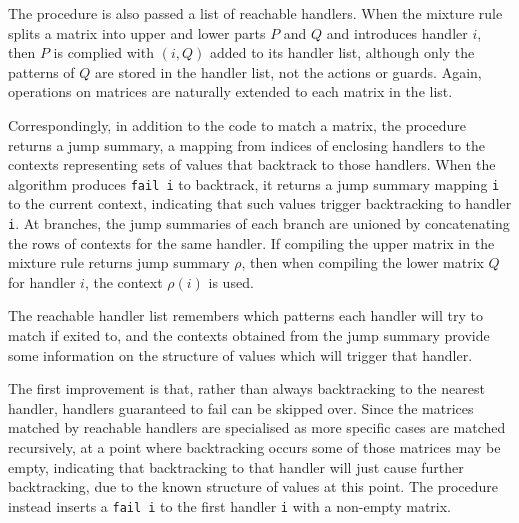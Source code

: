 The procedure is also passed a list of reachable handlers. When the mixture rule splits a matrix into upper and lower parts $P$ and $Q$ and introduces handler $i$, then $P$ is complied with $(i, Q)$ added to its handler list, although only the patterns of $Q$ are stored in the handler list, not the actions or guards. Again, operations on matrices are naturally extended to each matrix in the list. 

Correspondingly, in addition to the code to match a matrix, the procedure returns a jump summary, a mapping from indices of enclosing handlers to the contexts representing sets of values that backtrack to those handlers.
 When the algorithm produces \verb|fail i| to backtrack, it returns a jump summary mapping \verb|i| to the current context, indicating that such values trigger backtracking to handler \verb|i|. At branches, the jump summaries of each branch are unioned by concatenating the rows of contexts for the same handler. %
%
If compiling the upper matrix in the mixture rule returns jump summary $\rho$, then when compiling the lower matrix $Q$ for handler $i$, the context $\rho(i)$ is used.%


The reachable handler list remembers which patterns each handler will try to match if exited to, and the contexts obtained from the jump summary provide some information on the structure of values which will trigger that handler. 

The first improvement is that, rather than always backtracking to the nearest handler, handlers guaranteed to fail can be skipped over. Since the matrices matched by reachable handlers are specialised as more specific cases are matched recursively, at a point where backtracking occurs some of those matrices may be empty, indicating that backtracking to that handler will just cause further backtracking, due to the known structure of values at this point. The procedure instead inserts a \verb|fail i| to the first handler \verb|i| with a non-empty matrix. %

